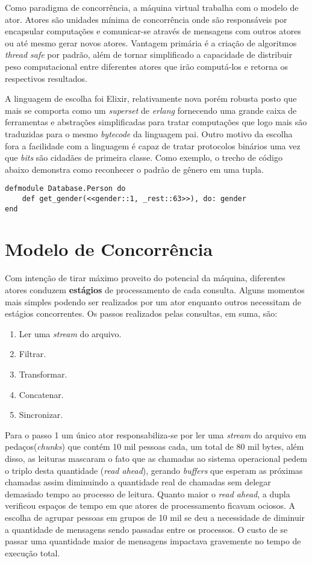 \documentclass[12pt]{article}
\begin{document}
Como paradigma de concorrência, a máquina virtual trabalha com o modelo de ator.
Atores são unidades mínima de concorrência onde são responsáveis por encapsular
computações e comunicar-se através de mensagens com outros atores ou até mesmo
gerar novos atores. Vantagem primária é a criação de algoritmos \textit{thread safe}
por padrão, além de tornar simplificado a capacidade de distribuir peso computacional
entre diferentes atores que irão computá-los e retorna os respectivos resultados.

A linguagem de escolha foi Elixir, relativamente nova porém robusta posto que mais se
comporta como um \textit{superset} de \textit{erlang} fornecendo uma grande caixa de
ferramentas e abstrações simplificadas para tratar computações que logo mais são traduzidas
para o mesmo \textit{bytecode} da linguagem pai. Outro motivo da escolha fora a facilidade
com a linguagem é capaz de tratar protocolos binários uma vez que \textit{bits} são cidadães
de primeira classe. Como exemplo, o trecho de código abaixo demonstra como reconhecer o
padrão de gênero em uma tupla.

\begin{verbatim}
defmodule Database.Person do
    def get_gender(<<gender::1, _rest::63>>), do: gender
end
\end{verbatim}

\section{Modelo de Concorrência}

Com intenção de tirar máximo proveito do potencial da máquina, diferentes atores conduzem
\textbf{estágios} de processamento de cada consulta. Alguns momentos mais simples podendo
ser realizados por um ator enquanto outros necessitam de estágios concorrentes. Os passos 
realizados pelas consultas, em suma, são:

\begin{enumerate}
    \item Ler uma \textit{stream} do arquivo.
    \item Filtrar.
    \item Transformar.
    \item Concatenar.
    \item Sincronizar.
\end{enumerate}

Para o passo 1 um único ator responsabiliza-se por ler uma \textit{stream} do arquivo
em pedaços(\textit{chunks}) que contém 10 mil pessoas cada, um total de 80 mil bytes, além
disso, as leituras mascaram o fato que as chamadas ao sistema operacional pedem o triplo
desta quantidade (\textit{read ahead}), gerando \textit{buffers} que esperam as próximas 
chamadas assim diminuindo a quantidade real de chamadas sem delegar demasiado tempo ao 
processo de leitura. Quanto maior o \textit{read ahead}, a dupla verificou espaços de tempo
em que atores de processamento ficavam ociosos. A escolha de agrupar pessoas em grupos de 10 
mil se deu a necessidade de diminuir a quantidade de mensagens sendo passadas entre os processos.
O custo de se passar uma quantidade maior de mensagens impactava gravemente no tempo de execução total.
\end{document}
